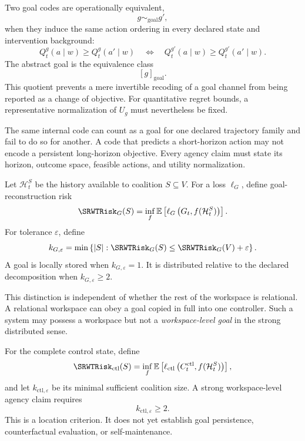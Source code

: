 Two goal codes are operationally equivalent,
\[
g\sim_{\mathrm{goal}}g',
\]
when they induce the same action ordering in every declared state and
intervention background:
\[
Q_t^g(a\mid w)
\geq
Q_t^g(a'\mid w)
\quad\Longleftrightarrow\quad
Q_t^{g'}(a\mid w)
\geq
Q_t^{g'}(a'\mid w).
\]
The abstract goal is the equivalence class
\[
[g]_{\mathrm{goal}}.
\]
This quotient prevents a mere invertible recoding of a goal channel from being
reported as a change of objective. For quantitative regret bounds, a
representative normalization of \(U_g\) must nevertheless be fixed.

\begin{SRWTremark}
The same internal code can count as a goal for one declared trajectory family
and fail to do so for another. A code that predicts a short-horizon action may
not encode a persistent long-horizon objective. Every agency claim must state
its horizon, outcome space, feasible actions, and utility normalization.
\end{SRWTremark}


Let \(\mathcal H_t^S\) be the history available to coalition \(S\subseteq V\).
For a loss \(\ell_G\), define goal-reconstruction risk
\[
\SRWTRisk_G(S)
=
\inf_f
\mathbb E
\left[
\ell_G
\left(
G_t,
f(\mathcal H_t^S)
\right)
\right].
\]
For tolerance \(\varepsilon\), define
\[
k_{G,\varepsilon}
=
\min
\left\{
|S|:
\SRWTRisk_G(S)
\leq
\SRWTRisk_G(V)+\varepsilon
\right\}.
\]
A goal is locally stored when \(k_{G,\varepsilon}=1\). It is distributed
relative to the declared decomposition when \(k_{G,\varepsilon}\geq2\).

This distinction is independent of whether the rest of the workspace is
relational. A relational workspace can obey a goal copied in full into one
controller. Such a system may possess a workspace but not a
\emph{workspace-level goal} in the strong distributed sense.

For the complete control state, define
\[
\SRWTRisk_{\mathrm{ctl}}(S)
=
\inf_f
\mathbb E
\left[
\ell_{\mathrm{ctl}}
\left(
C_t^{\mathrm{ctl}},
f(\mathcal H_t^S)
\right)
\right],
\]
and let \(k_{\mathrm{ctl},\varepsilon}\) be its minimal sufficient coalition
size. A strong workspace-level agency claim requires
\[
\boxed{k_{\mathrm{ctl},\varepsilon}\geq2.}
\]
This is a location criterion. It does not yet establish goal persistence,
counterfactual evaluation, or self-maintenance.


